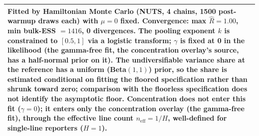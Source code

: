 \begin{table}[htbp]
\begin{tabular}{lrrrp{4cm}}
\midrule
\multicolumn{5}{p{15cm}}{Fitted by Hamiltonian Monte Carlo (NUTS, 4 chains, 1500 post-warmup draws each) with $\mu=0$ fixed. Convergence: max $\hat R = 1.00$, min bulk-ESS $= 1416$, 0 divergences. The pooling exponent $k$ is constrained to $[0.5,1]$ via a logistic transform; $\gamma$ is fixed at 0 in the likelihood (the gamma-free fit, the concentration overlay's source, has a half-normal prior on it). The undiversifiable variance share at the reference has a uniform (Beta$(1,1)$) prior, so the share is estimated conditional on fitting the floored specification rather than shrunk toward zero; comparison with the floorless specification does not identify the asymptotic floor. Concentration does not enter this fit ($\gamma = 0$); it enters only the concentration overlay (the gamma-free fit), through the effective line count $n_{\text{eff}} = 1/H$, well-defined for single-line reporters ($H=1$).} \\
\bottomrule
\end{tabular}
\end{table}
